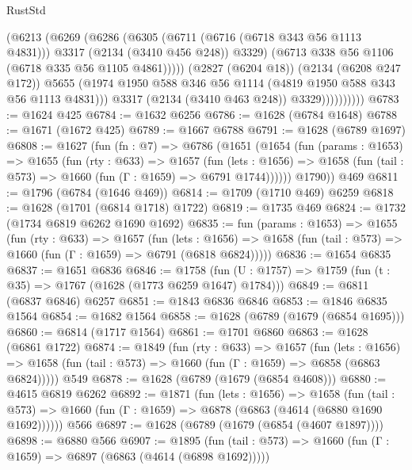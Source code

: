 \begin{lexlean}{RustStd}
\begin{coremodule}
                          (@6213
                            (@6269
                              (@6286
                                (@6305
                                  (@6711 (@6716 (@6718 @343 @56 @1113 @4831)))
                                  @3317
                                  (@2134 (@3410 @456 @248))
                                  @3329)
                                (@6713 @338 @56 @1106 (@6718 @335 @56 @1105 @4861)))))
                          (@2827 (@6204 @18))
                          (@2134 (@6208 @247 @172))
                          @5655
                          (@1974 @1950 @588 @346 @56 @1114 (@4819 @1950 @588 @343 @56 @1113 @4831)))
                        @3317
                        (@2134 (@3410 @463 @248))
                        @3329))))))))))
@6783 := @1624 @425
@6784 := @1632 @6256
@6786 := @1628 (@6784 @1648)
@6788 := @1671 (@1672 @425)
@6789 := @1667 @6788
@6791 := @1628 (@6789 @1697)
@6808 := @1627
    (fun (fn : @7) =>
    @6786
      (@1651
        (@1654
          (fun (params : @1653) =>
          @1655
            (fun (rty : @633) =>
            @1657
              (fun (lets : @1656) =>
              @1658 (fun (tail : @573) => @1660 (fun (Γ : @1659) => @6791 @1744))))))
        @1790))
    @469
@6811 := @1796 (@6784 (@1646 @469))
@6814 := @1709 (@1710 @469) @6259
@6818 := @1628 (@1701 (@6814 @1718) @1722)
@6819 := @1735 @469
@6824 := @1732 (@1734 @6819 @6262 @1690 @1692)
@6835 := fun (params : @1653) =>
  @1655
    (fun (rty : @633) =>
    @1657
      (fun (lets : @1656) =>
      @1658 (fun (tail : @573) => @1660 (fun (Γ : @1659) => @6791 (@6818 @6824)))))
@6836 := @1654 @6835
@6837 := @1651 @6836
@6846 := @1758 (fun (U : @1757) => @1759 (fun (t : @35) => @1767 (@1628 (@1773 @6259 @1647) @1784)))
@6849 := @6811 (@6837 @6846) @6257
@6851 := @1843 @6836 @6846
@6853 := @1846 @6835 @1564
@6854 := @1682 @1564
@6858 := @1628 (@6789 (@1679 (@6854 @1695)))
@6860 := @6814 (@1717 @1564)
@6861 := @1701 @6860
@6863 := @1628 (@6861 @1722)
@6874 := @1849
    (fun (rty : @633) =>
    @1657
      (fun (lets : @1656) =>
      @1658 (fun (tail : @573) => @1660 (fun (Γ : @1659) => @6858 (@6863 @6824)))))
    @549
@6878 := @1628 (@6789 (@1679 (@6854 @4608)))
@6880 := @4615 @6819 @6262
@6892 := @1871
    (fun (lets : @1656) =>
    @1658
      (fun (tail : @573) => @1660 (fun (Γ : @1659) => @6878 (@6863 (@4614 (@6880 @1690 @1692))))))
    @566
@6897 := @1628 (@6789 (@1679 (@6854 (@4607 @1897))))
@6898 := @6880 @566
@6907 := @1895
    (fun (tail : @573) => @1660 (fun (Γ : @1659) => @6897 (@6863 (@4614 (@6898 @1692)))))

\end{coremodule}
\end{lexlean}
